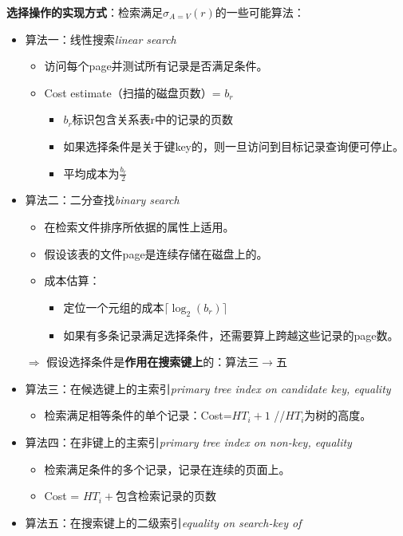 \documentclass[b5paper, twoside]{article}
\let\oldtextbf\textbf
\renewcommand{\textbf}[1]{\textcolor{myblue}{\oldtextbf{#1}}}
\let\oldemph\emph
\renewcommand{\emph}[1]{\textcolor{mypink}{\oldemph{#1}}}
\begin{document}
\textbf{选择操作的实现方式}：检索满足$\sigma_{A=V}(r)$的一些可能算法：
\begin{itemize}
	\item 算法一：线性搜索\hfill \emph{linear search}
	\begin{itemize}
		\item 访问每个page并测试所有记录是否满足条件。
		\item Cost estimate（扫描的磁盘页数）= $b_r$
		\begin{itemize}
			\item $b_r$标识包含关系表r中的记录的页数
			\item 如果选择条件是关于键key的，则一旦访问到目标记录查询便可停止。
			\item 平均成本为$\frac{b_r}{2}$
		\end{itemize}
	\end{itemize}
	\item 算法二：二分查找\hfill \emph{binary search}
	\begin{itemize}
		\item 在检索文件排序所依据的属性上适用。
		\item 假设该表的文件page是连续存储在磁盘上的。
		\item 成本估算：
		\begin{itemize}
			\item 定位一个元组的成本$\lceil \log_2(b_r) \rceil$
			\item 如果有多条记录满足选择条件，还需要算上跨越这些记录的page数。
		\end{itemize}
	\end{itemize}
	\item[$\Rightarrow$] 
	假设选择条件是\textbf{作用在搜索键上}的：算法三$\rightarrow$五
	\item 算法三：在候选键上的主索引\hfill \emph{primary tree index on candidate 
	key, equality}
	\begin{itemize}
		\item 检索满足相等条件的单个记录：Cost=$HT_i+1$ //$HT_i$为树的高度。
	\end{itemize}
	\item 算法四：在非键上的主索引\hfill \emph{primary tree index on non-key, 
	equality}
	\begin{itemize}
		\item 检索满足条件的多个记录，记录在连续的页面上。
		\item Cost = $HT_i+\text{包含检索记录的页数}$
	\end{itemize}
	\item 算法五：在搜索键上的二级索引\hfill \emph{equality on search-key of 
}
\end{itemize}
\end{document}
